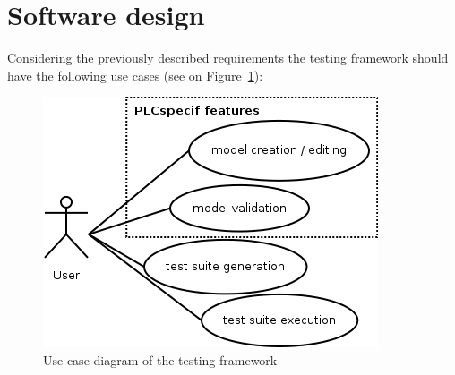 

\section{Software design}
\label{sec:softwaredesign}

Considering the previously described requirements the testing framework should have the following use cases (see on Figure~\ref{fig:designuc}):

\begin{figure}[htp]
\centering
\includegraphics[scale=0.6]{figures/design_uc.png}
\caption{Use case diagram of the testing framework}
\label{fig:designuc}
\end{figure}

